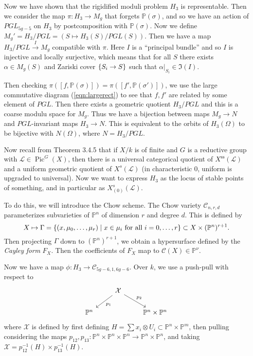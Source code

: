 \documentclass[leqno, openany]{memoir}
\theoremstyle{definition}
\theoremstyle{remark}
\theoremstyle{plain}
\theoremstyle{definition}
\theoremstyle{remark}
\renewcommand{\P}{\mathbb{P}}
\newcommand{\mc}[1]{\mathcal{#1}}
\newcommand{\mr}[1]{\mathrm{#1}}
\DeclareMathOperator{\Pic}{Pic}
\begin{document}
Now we have shown that the rigidified moduli problem $H_3$ is representable.
Then we consider the map $\pi \colon H_3 \to M_g$ that forgets $\P(\sigma)$,
and so we have an action of $PGL_{5g-5}$ on $H_3$ by postcomposition with
$\P(\sigma)$. Now we define $M_g' = H_3 / PGL = (S \mapsto H_3(S) / PGL(S))$.
Then we have a map $H_3 / PGL \xrightarrow{I} M_g$ compatible with $\pi$. Here
$I$ is a ``principal bundle'' and so $I$ is injective and locally surjective,
which means that for all $S$ there exists $\alpha \in M_g(S)$ and Zariski cover
$\qty{S_i \to S}$ such that $\alpha|_{S_i} \in \Im(I)$.

Then checking $\pi([f, \P(\sigma)]) = \pi([f', \P(\sigma')])$, we use the large
commutative diagram (\ref{eqn:largerect}) to see that $f,f'$ are related by
some element of $PGL$. Then there exists a geometric quotient $H_3 / PGL$ and
this is a coarse modulu space for $M_g$. Thus we have a bijection between maps
$M_g \to N$ and $PGL$-invariant maps $H_3 \to N$. This is equivalent to the
orbits of $H_3(\Omega)$ to be bijective with $N(\Omega)$, where $N = H_3 /
PGL$.

Now recall from Theorem 3.4.5 that if $X/k$ is of finite and $G$ is a reductive
group with $\mc{L} \in \Pic^G(X)$, then there is a universal categorical
quotient of $X^{\mr{ss}}(\mc{L})$ and a uniform geometric quotient of
$X^s(\mc{L})$ (in characteristic $0$, uniform is upgraded to universal). Now we
want to express $H_3$ as the locus of stable points of something, and in
particular as $X^s_{(0)}(\mc{L})$.

To do this, we will introduce the Chow scheme. The Chow variety $\mc{C}_{n, r,
d}$ parameterizes subvarieties of $\P^n$ of dimension $r$ and degree $d$. This
is defined by \[ X \mapsto \Gamma = \qty{(x, \mu_0, \ldots, \mu_r) \mid x \in
\mu_i \text{ for all }i = 0, \ldots, r} \subset X \times (\P^n)^{r+1}. \] Then
projecting $\Gamma$ down to $(\P^n)^{r+1}$, we obtain a hypersurface defined by
the \textit{Cayley form} $F_X$. Then the coefficients of $F_X$ map to
$\mc{C}(X) \in \P^{\nu}$. 

Now we have a map $\phi \colon H_3 \to \mc{C}_{5g-6, 1, 6g-6}$. Over $k$, we
use a push-pull with respect to \begin{equation*} \begin{tikzcd} & \mc{X}
\arrow{dl}{p_1} \arrow{dr}{p_2} \\ \P^n & & \P^n \times \P^n \end{tikzcd}
\end{equation*} where $\mc{X}$ is defined by first defining $H = \sum x_i
\otimes U_i \subset \P^n \times \P^m$, then pulling considering the maps
$p_{12}, p_{13} \colon \P^n \times \P^n \times \P^n \to \P^n \times \P^n$, and
taking $\mc{X} = p_{12}^{-1}(H) \times p_{13}^{-1}(H)$.
\end{document}
